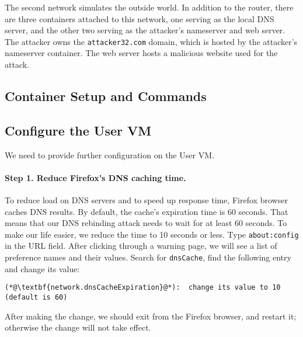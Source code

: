 The second network simulates the outside world. In addition to
the router, there are three containers attached to this network,
one serving as the local DNS server, and the other two
serving as the attacker's nameserver and web server.
The attacker owns the \texttt{attacker32.com} domain, 
which is hosted by the attacker's nameserver container. 
The web server hosts a malicious website used for the 
attack. 



\subsection{Container Setup and Commands}






\subsection{Configure the User VM}

We need to provide further configuration on the User VM.


\paragraph{Step 1. Reduce Firefox's DNS caching time.}
To reduce load on DNS servers and to speed up response time, Firefox browser caches DNS
results.  By default, the cache's expiration time is 60 seconds. That means that our DNS
rebinding attack needs to wait for at least 60 seconds. To make our life easier, we reduce
the time to 10 seconds or less. Type \texttt{about:config} in the URL field.
After clicking through a warning page, we will see a list of preference names and their values.
Search for \texttt{dnsCache}, find the following entry and change its value:

\begin{lstlisting}
(*@\textbf{network.dnsCacheExpiration}@*):  change its value to 10 (default is 60)
\end{lstlisting}

After making the change, we should exit from the Firefox browser, and restart it; otherwise the
change will not take effect.


